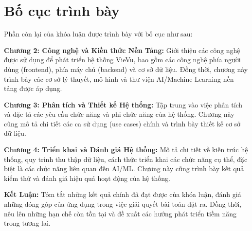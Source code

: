 \newpage
\section{Bố cục trình bày}
Phần còn lại của khóa luận được trình bày với bố cục như sau:

\textbf{Chương 2: Công nghệ và Kiến thức Nền Tảng:}
Giới thiệu các công nghệ được sử dụng để phát triển hệ thống VieVu, bao gồm các công nghệ phía người dùng (frontend), phía máy chủ (backend) và cơ sở dữ liệu. Đồng thời, chương này trình bày các cơ sở lý thuyết, mô hình và thư viện AI/Machine Learning nền tảng được áp dụng.

\textbf{Chương 3: Phân tích và Thiết kế Hệ thống:}
Tập trung vào việc phân tích và đặc tả các yêu cầu chức năng và phi chức năng của hệ thống. Chương này cũng mô tả chi tiết các ca sử dụng (use cases) chính và trình bày thiết kế cơ sở dữ liệu.

\textbf{Chương 4: Triển khai và Đánh giá Hệ thống:}
Mô tả chi tiết về kiến trúc hệ thống, quy trình thu thập dữ liệu, cách thức triển khai các chức năng cụ thể, đặc biệt là các chức năng liên quan đến AI/ML. Chương này cũng trình bày kết quả kiểm thử và đánh giá hiệu quả hoạt động của hệ thống.

\textbf{Kết Luận:}
Tóm tắt những kết quả chính đã đạt được của khóa luận, đánh giá những đóng góp của ứng dụng trong việc giải quyết bài toán đặt ra. Đồng thời, nêu lên những hạn chế còn tồn tại và đề xuất các hướng phát triển tiềm năng trong tương lai.
